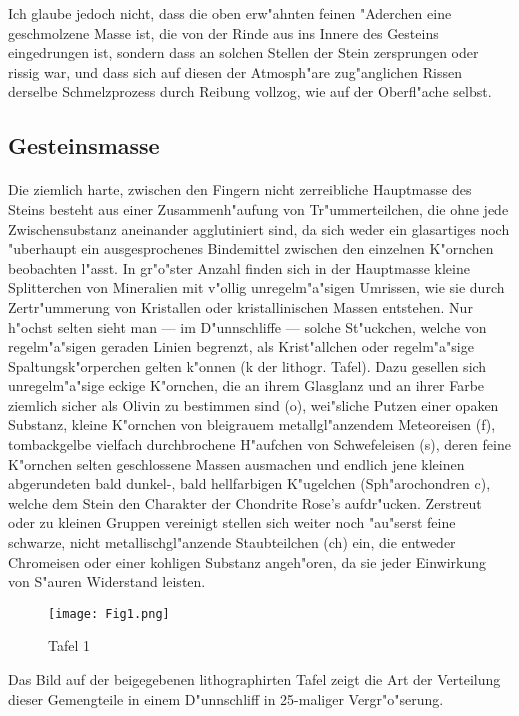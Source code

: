 \documentclass[a4paper, 11pt, oneside]{article}
\begin{document}
Ich glaube jedoch nicht, dass die oben erw"ahnten feinen "Aderchen eine geschmolzene Masse ist, die von der Rinde aus ins Innere des Gesteins eingedrungen ist, sondern dass an solchen Stellen der Stein zersprungen oder rissig war, und dass sich auf diesen der Atmosph"are zug"anglichen Rissen derselbe Schmelzprozess durch Reibung vollzog, wie auf der Oberfl"ache selbst.
\clearpage
\subsection{Gesteinsmasse}
\paragraph{}
Die ziemlich harte, zwischen den Fingern nicht zerreibliche Hauptmasse des Steins besteht aus einer Zusammenh"aufung von Tr"ummerteilchen, die ohne jede Zwischensubstanz aneinander agglutiniert sind, da sich weder ein glasartiges noch "uberhaupt ein ausgesprochenes Bindemittel zwischen den einzelnen K"ornchen beobachten l"asst. In gr"o"ster Anzahl finden sich in der Hauptmasse kleine Splitterchen von Mineralien mit v"ollig unregelm"a"sigen Umrissen, wie sie durch Zertr"ummerung von Kristallen oder kristallinischen Massen entstehen. Nur h"ochst selten sieht man --- im D"unnschliffe --- solche St"uckchen, welche von regelm"a"sigen geraden Linien begrenzt, als Krist"allchen oder regelm"a"sige Spaltungsk"orperchen gelten k"onnen (k der lithogr. Tafel). Dazu gesellen sich unregelm"a"sige eckige K"ornchen, die an ihrem Glasglanz und an ihrer Farbe ziemlich sicher als Olivin zu bestimmen sind (o), wei"sliche Putzen einer opaken Substanz, kleine K"ornchen von bleigrauem metallgl"anzendem Meteoreisen (f), tombackgelbe vielfach durchbrochene H"aufchen von Schwefeleisen (s), deren feine K"ornchen selten geschlossene Massen ausmachen und endlich jene kleinen abgerundeten bald dunkel-, bald hellfarbigen K"ugelchen (Sph"arochondren c), welche dem Stein den Charakter der Chondrite Rose's aufdr"ucken. Zerstreut oder zu kleinen Gruppen vereinigt stellen sich weiter noch "au"serst feine schwarze, nicht metallischgl"anzende Staubteilchen (ch) ein, die entweder Chromeisen oder einer kohligen Substanz angeh"oren, da sie jeder Einwirkung von S"auren Widerstand leisten.
\clearpage
\begin{figure}[t]
\centering
\texttt{[image: Fig1.png]}
\caption{Tafel 1}
\end{figure}
Das Bild auf der beigegebenen lithographirten Tafel zeigt die Art der Verteilung dieser Gemengteile in einem D"unnschliff in 25-maliger Vergr"o"serung.
\end{document}
